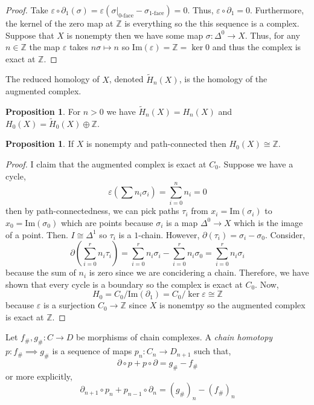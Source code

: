 \documentclass[12pt]{extarticle}
\newcommand{\Z}{\mathbb{Z}}
\renewcommand{\Im}[1]{\mathrm{Im}(#1)}
\theoremstyle{definition}
\newtheorem{proposition}[theorem]{Proposition}
\newenvironment{definition}[1][Definition:]{\begin{trivlist}
\item[\hskip \labelsep {\bfseries #1}]}{\end{trivlist}}
\begin{document}
\begin{proof}
Take $\varepsilon \circ \partial_1(\sigma) = \varepsilon(\sigma|_{\text{0-face}} - \sigma_{\text{1-face}}) = 0$. Thus, $\varepsilon \circ \partial_1 = 0$. Furthermore, the kernel of the zero map at $\Z$ is everything so the this sequence is a complex. \bigskip\\
Suppose that $X$ is nonempty then we have some map $\sigma : \Delta^0 \to X$. Thus, for any $n \in \Z$ the map $\varepsilon$ takes $n \sigma \mapsto n$ so $\Im{\varepsilon} = \Z = \ker{0}$ and thus the complex is exact at $\Z$. 
\end{proof}


\begin{definition}
The reduced homology of $X$, denoted $\tilde{H}_n(X)$, is the homology of the augmented complex.
\end{definition}

\begin{proposition}
For $n > 0$ we have $\tilde{H}_n(X) = H_n(X)$ and $H_0(X) = \tilde{H}_0(X) \oplus \Z$. 
\end{proposition}


\begin{proposition}
If $X$ is nonempty and path-connected then $H_0(X) \cong \Z$.
\end{proposition}

\begin{proof}
I claim that the augmented complex is exact at $C_0$. Suppose we have a cycle,
\[\varepsilon \left(\sum n_i \sigma_i \right) = \sum_{i = 0}^n n_i =  0\]
then by path-connectedness, we can pick paths $\tau_i$ from $x_i = \Im{\sigma_i}$ to $x_0 = \Im{\sigma_0}$ which are points because $\sigma_i$ is a map $\Delta^0 \to X$ which is the image of a point. Then. $I \cong \Delta^1$ so $\tau_i$ is a $1$-chain. However, $\partial(\tau_i) = \sigma_i - \sigma_0$. Consider,
\[ \partial \left(\sum_{i = 0}^r n_i \tau_i \right) = \sum_{i = 0}^r n_i \sigma_i - \sum_{i = 0}^r n_i \sigma_0 =  \sum_{i = 0}^r n_i \sigma_i\]
because the sum of $n_i$ is zero since we are concidering a chain. Therefore, we have shown that every cycle is a boundary so the complex is exact at $C_0$. Now, 
\[H_0 = C_0 / \Im{\partial_1} = C_0 / \ker{\varepsilon} \cong \Z\]
because $\varepsilon$ is a surjection $C_0 \to \Z$ since $X$ is nonemtpy so the augmented complex is exact at $\Z$.  
\end{proof}

\begin{definition}
Let $f_{\#}, g_{\#} : C \to D$ be morphisms of chain complexes. A \textit{chain homotopy} $p : f_{\#} \implies g_{\#}$ is a sequence of maps $p_n : C_n \to D_{n+1}$ such that, 
\[\partial \circ p + p \circ \partial = g_{\#} - f_{\#}\]
or more explicitly,
\[ 
\partial_{n+1} \circ p_n + p_{n-1} \circ \partial_{n} = (g_{\#})_n - (f_{\#})_n\] 
\end{definition}
\end{document}
